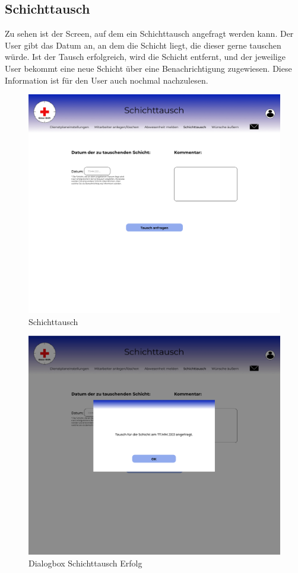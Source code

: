 \documentclass[11pt,
paper=a4,
bibtotocnumbered,	  %
liststotocnumbered,  %
DIV=calc,		  %
tablecaptionabove,	  %
headinclude,
]{article}
\begin{document}
\subsection{Schichttausch}
Zu sehen ist der Screen, auf dem ein Schichttausch angefragt werden kann. Der User gibt das Datum an, an dem die Schicht liegt, die dieser gerne tauschen würde. Ist der Tausch erfolgreich, wird die Schicht entfernt, und der jeweilige User bekommt eine neue Schicht über eine Benachrichtigung zugewiesen. Diese Information ist für den User auch nochmal nachzulesen. 
\begin{figure}[H]
\includegraphics[width=1\textwidth]{Bilder/Screens/Schichttausch.jpg}{\centering}
\caption{Schichttausch}
\end{figure}
\begin{figure}[H]
\includegraphics[width=1\textwidth]{Bilder/Screens/Schichttausch-1.jpg}{\centering}
\caption{Dialogbox Schichttausch Erfolg}
\end{figure}
\end{document}
